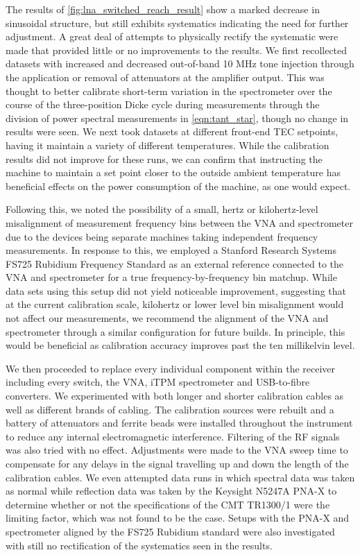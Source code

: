 The results of \cref{fig:lna_switched_reach_result} show a marked decrease in sinusoidal structure, but still exhibits systematics indicating the need for further adjustment. A great deal of attempts to physically rectify the systematic were made that provided little or no improvements to the results. We first recollected datasets with increased and decreased out-of-band 10 MHz tone injection through the application or removal of attenuators at the amplifier output. This was thought to better calibrate short-term variation in the spectrometer over the course of the three-position Dicke cycle during measurements through the division of power spectral measurements in \cref{eqn:tant_star}, though no change in results were seen. We next took datasets at different front-end TEC setpoints, having it maintain a variety of different temperatures. While the calibration results did not improve for these runs, we can confirm that instructing the machine to maintain a set point closer to the outside ambient temperature has beneficial effects on the power consumption of the machine, as one would expect.

Following this, we noted the possibility of a small, hertz or kilohertz-level misalignment of measurement frequency bins between the VNA and spectrometer due to the devices being separate machines taking independent frequency measurements. In response to this, we employed a Stanford Research Systems FS725 Rubidium Frequency Standard as an external reference connected to the VNA and spectrometer for a true frequency-by-frequency bin matchup. While data sets using this setup did not yield noticeable improvement, suggesting that at the current calibration scale, kilohertz or lower level bin misalignment would not affect our measurements, we recommend the alignment of the VNA and spectrometer through a similar configuration for future builds. In principle, this would be beneficial as calibration accuracy improves past the ten millikelvin level.

We then proceeded to replace every individual component within the receiver including every switch, the VNA, iTPM spectrometer and USB-to-fibre converters. We experimented with both longer and shorter calibration cables as well as different brands of cabling. The calibration sources were rebuilt and a battery of attenuators and ferrite beads were installed throughout the instrument to reduce any internal electromagnetic interference. Filtering of the RF signals was also tried with no effect. Adjustments were made to the VNA sweep time to compensate for any delays in the signal travelling up and down the length of the calibration cables. We even attempted data runs in which spectral data was taken as normal while reflection data was taken by the Keysight N5247A PNA-X to determine whether or not the specifications of the CMT TR1300/1 were the limiting factor, which was not found to be the case. Setups with the PNA-X and spectrometer aligned by the FS725 Rubidium standard were also investigated with still no rectification of the systematics seen in the results.

